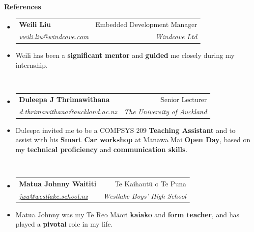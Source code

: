 \documentclass[11pt,a4paper]{article}[leftmargin=*]
\makeatletter
\def \entryspacing {-0pt}
\renewcommand{\section}[2]{\vspace{5pt}
  \colorbox{secondary}{\color{white}\raggedbottom\normalsize\textbf{{#1}{\hspace{2pt}#2\hspace{4pt}}}}
}
\newcommand{\resumeEntryStart}{\begin{itemize}[leftmargin=2.5mm]}
\newcommand{\resumeEntryEnd}{\end{itemize}\vspace{\entryspacing}}
\newcommand{\resumeEntryTSDL}[4]{
  \vspace{-1pt}\item[]
    \begin{tabularx}{0.97\textwidth}{X@{\hspace{60pt}}r}
      \textbf{\color{primary}#1} & {\firabook\color{accent}\small#2} \\
      \textit{\color{accent}\small#3} & \textit{\color{accent}\small#4} \\
    \end{tabularx}\vspace{-6pt}
}
\newcommand{\resumeEntryS}[2]{
  \item[]\small{
    \textbf{\color{primary}#1 }{ #2 \vspace{-4pt}}
  }
}
\newcommand{\resumeEntryP}[1]{
  \item[]\small{
    #1 \vspace{-4pt}
  }\\
}
\newcommand{\resumeBf}[1]{\small\textbf{\color{halfbold}#1}}
\makeatother
\begin{document}







\section{\faUserCheck}{References}

\resumeEntryStart
\resumeEntryTSDL
{Weili Liu}{Embedded Development Manager}
{\href{mailto:weili.liu@windcave.com}{weili.liu@windcave.com}}{Windcave Ltd}

\resumeEntryP{
  Weili has been a \resumeBf{significant mentor} and \resumeBf{guided} me closely during my internship.
}
\resumeEntryEnd

\resumeEntryStart
\resumeEntryTSDL
{Duleepa J Thrimawithana}{Senior Lecturer}
{\href{mailto:d.thrimawithana@auckland.ac.nz}{d.thrimawithana@auckland.ac.nz}}{The University of Auckland}

\resumeEntryP{
  Duleepa invited me to be a COMPSYS 209 \resumeBf{Teaching Assistant} and to assist with his \resumeBf{Smart Car workshop} at Mānawa Mai \resumeBf{Open Day}, based on my \resumeBf{technical proficiency} and \resumeBf{communication skills}.
}
\resumeEntryEnd

\resumeEntryStart
\resumeEntryTSDL
{Matua Johnny Waititi}{Te Kaihautū o Te Puna}
{\href{mailto:jwa@westlake.school.nz}{jwa@westlake.school.nz}}{Westlake Boys' High School}

\resumeEntryP{
  Matua Johnny was my Te Reo Māori \resumeBf{kaiako} and \resumeBf{form teacher}, and has played a \resumeBf{pivotal} role in my life.
}
\resumeEntryEnd
\end{document}
